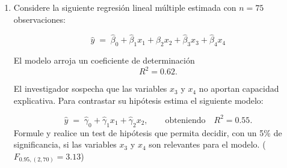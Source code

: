 \documentclass[10pt,a4paper]{article}
\begin{document}
\begin{enumerate}
\begin{enumerate}
    \item ¿Se puede rechazar la hipótesis nula con la información que disponemos con una significancia del 5\%?

\end{enumerate}

{\color{blue}

\textbf{Solución}
\begin{enumerate}
    \item $$H_0 : \beta_1-4\beta_3 = 0$$
$$H_1 : \beta_1-4\beta_3 \neq 0$$
\item el estad\'istico t esta dado por:
$$t = \frac{\beta_1-4\beta_3}{s.e.(\beta_1-4\beta_3)}$$

\[
\text{Var}(\hat{\beta}) = 2 \cdot
\begin{bmatrix}
1 & 0  & 0  &  0\\
0 & 1  & 0  & -1\\
0 & 0  & 2  & -1\\
0 & -1 & -1 &  1
\end{bmatrix}
=
\begin{bmatrix}
2 & 0  & 0  &  0\\
0 & 2  & 0  & -2\\
0 & 0  & 4  & -2\\
0 & -2 & -2 &  2
\end{bmatrix}
\]



 $s.e.(\beta_1-4\beta_3)$ esta dado por:
$$s.e.(\beta_1-4\beta_3)=\sqrt{Var(\beta_1-4\beta_3)}=\sqrt{Var(\beta_1)+16Var(\beta_3)-8Cov(\beta_1,\beta_3)}$$
$$\sqrt{Var(\beta_1)+16Var(\beta_3)-8Cov(\beta_1,\beta_3)}=\sqrt{2+16\cdot 2-8 \cdot (-2)}=\sqrt{50}$$
por tanto 
$$t = \frac{9-4\cdot2}{7.07}=0,14$$
 No se rechaza $H_0$,  $\beta_1$ puede  ser $4\beta_3$. 


\end{enumerate}}

\item Considere la siguiente regresión lineal múltiple estimada con \(n = 75\) observaciones:

\[
\hat{y} \;=\; \hat{\beta}_{0} + \hat{\beta}_{1}x_{1} + \hat{\beta}_{2}x_{2} +\hat{\beta}_{3}x_{3} +\hat{\beta}_{4}x_{4} 
\]

El modelo arroja un coeficiente de determinación
\[
R^2 = 0.62.
\]

El investigador sospecha que las variables \(x_{3}\) y \(x_{4}\) no aportan capacidad explicativa.  
Para contrastar su hipótesis estima el siguiente modelo:

\[
\hat{y} \;=\;\hat{\gamma}_{0} + \hat{\gamma}_{1}x_{1} + \hat{\gamma}_{2}x_{2} ,
\qquad\text{obteniendo}\quad
R^2 = 0.55.
\]
Formule y realice un test de hipótesis que permita decidir, con un 5\% de significancia, si las variables \(x_{3}\) y \(x_{4}\) son relevantes para el modelo. ($F_{0.95,(2,70)}=3.13$)


\end{enumerate}
\end{document}
